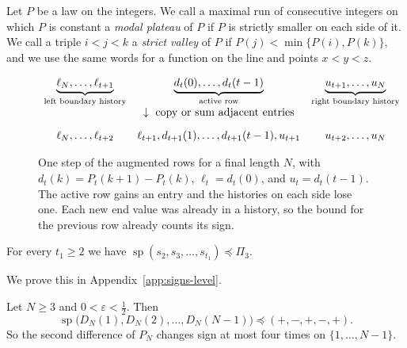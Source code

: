 Let $P$ be a law on the integers. We call a maximal run of
consecutive integers on which $P$ is constant a \emph{modal plateau}
of $P$ if $P$ is strictly smaller on each side of it. We call a triple
$i<j<k$ a \emph{strict valley} of $P$ if $P(j)<\min\{P(i),P(k)\}$, and
we use the same words for a function on the line and points $x<y<z$.

\begin{figure}[ht]
\centering
\small
\[
\begin{array}{c@{\quad}c@{\quad}c}
\underbrace{\ell_N,\ldots,\ell_{t+1}}_{\text{left boundary history}}&
\underbrace{d_t(0),\ldots,d_t(t-1)}_{\text{active row}}&
\underbrace{u_{t+1},\ldots,u_N}_{\text{right boundary history}}\\[9pt]
&\downarrow\ \text{copy or sum adjacent entries}&\\[9pt]
\ell_N,\ldots,\ell_{t+2}&
\ell_{t+1},d_{t+1}(1),\ldots,d_{t+1}(t-1),u_{t+1}&
u_{t+2},\ldots,u_N
\end{array}
\]
\caption{One step of the augmented rows for a final length $N$, with
$d_t(k)=P_t(k+1)-P_t(k)$, $\ell_t=d_t(0)$, and $u_t=d_t(t-1)$. The
active row gains an entry and the histories on each side lose one.
Each new end value was already in a history, so the bound for the
previous row already counts its sign.}
\label{fig:augmented-rows}
\end{figure}

\begin{lemma}\label{lem:level-one}
For every $t_1\ge2$ we have $\operatorname{sp}(s_2,s_3,\dots,s_{t_1})\preceq\Pi_3$.
\end{lemma}

We prove this in Appendix~\ref{app:signs-level}.

\begin{theorem}\label{thm:five-blocks}
Let $N\ge3$ and $0<\varepsilon<\frac12$. Then
\[
 \operatorname{sp}\bigl(D_N(1),D_N(2),\dots,D_N(N-1)\bigr)\preceq(+,-,+,-,+).
\]
So the second difference of $P_N$ changes sign at most four times on
$\{1,\dots,N-1\}$.
\end{theorem}

